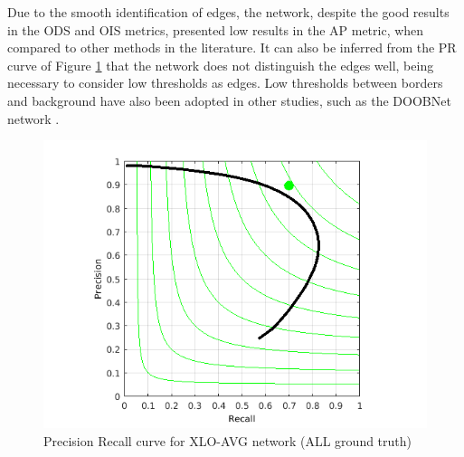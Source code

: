 
Due to the smooth identification of edges, the network, despite the good results in the ODS and OIS metrics, presented low results in the AP metric, when compared to other methods in the literature.
It can also be inferred from the PR curve of Figure \ref{fig:bsds_xlo_avg_curve} that the network does not distinguish the edges well, being necessary to consider low thresholds as edges. 
Low thresholds between borders and background have also been adopted in other studies, such as the DOOBNet network \cite{Cumulative:Song20181847}.

\begin{figure}%
  \centering
  \includegraphics[width=0.9\columnwidth]{../imagens/graficos/cap6_xlo-avg.png}
  \caption{Precision Recall curve for XLO-AVG network (ALL ground truth)}
  \label{fig:bsds_xlo_avg_curve}
\end{figure}


